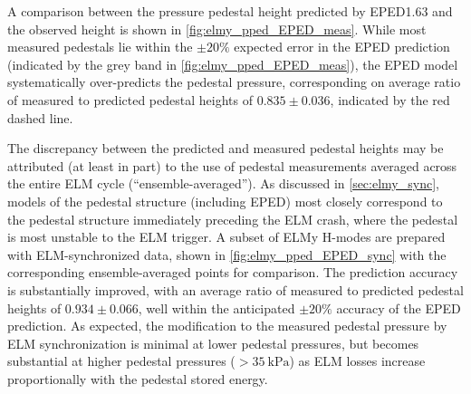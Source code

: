 A comparison between the pressure pedestal height predicted by EPED1.63 and the observed height is shown in \cref{fig:elmy_pped_EPED_meas}.  While most measured pedestals lie within the $\pm 20\%$ expected error in the EPED prediction (indicated by the grey band in \cref{fig:elmy_pped_EPED_meas}), the EPED model systematically over-predicts the pedestal pressure, corresponding on average ratio of measured to predicted pedestal heights of $0.835 \pm 0.036$, indicated by the red dashed line.

\begin{figure}[h]
 \pushtooutside
\end{figure}

The discrepancy between the predicted and measured pedestal heights may be attributed (at least in part) to the use of pedestal measurements averaged across the entire ELM cycle (``ensemble-averaged'').  As discussed in \cref{sec:elmy_sync}, models of the pedestal structure (including EPED) most closely correspond to the pedestal structure immediately preceding the ELM crash, where the pedestal is most unstable to the ELM trigger.  A subset of ELMy H-modes are prepared with ELM-synchronized data, shown in \cref{fig:elmy_pped_EPED_sync} with the corresponding ensemble-averaged points for comparison.  The prediction accuracy is substantially improved, with an average ratio of measured to predicted pedestal heights of $0.934 \pm 0.066$, well within the anticipated $\pm 20\%$ accuracy of the EPED prediction.  As expected, the modification to the measured pedestal pressure by ELM synchronization is minimal at lower pedestal pressures, but becomes substantial at higher pedestal pressures ($> \SI{35}{\kilo\pascal}$) as ELM losses increase proportionally with the pedestal stored energy.

